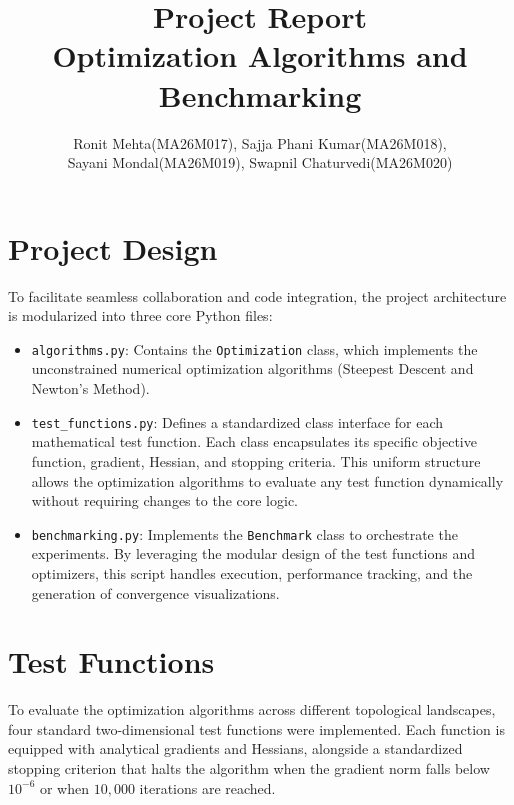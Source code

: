 \documentclass{report}
\title{Project Report\\
  Optimization Algorithms and Benchmarking}
\author{Ronit Mehta(MA26M017), Sajja Phani Kumar(MA26M018),\\
  Sayani Mondal(MA26M019), Swapnil Chaturvedi(MA26M020)}
\date{}
\begin{document}
\maketitle

\section*{Project Design}
To facilitate seamless collaboration and code integration, the project architecture is modularized into three core Python files:

\begin{itemize}
    \item \texttt{algorithms.py}: Contains the \texttt{Optimization} class, which implements the unconstrained numerical optimization algorithms (Steepest Descent and Newton's Method).
    \item \texttt{test\_functions.py}: Defines a standardized class interface for each mathematical test function. Each class encapsulates its specific objective function, gradient, Hessian, and stopping criteria. This uniform structure allows the optimization algorithms to evaluate any test function dynamically without requiring changes to the core logic.
    \item \texttt{benchmarking.py}: Implements the \texttt{Benchmark} class to orchestrate the experiments. By leveraging the modular design of the test functions and optimizers, this script handles execution, performance tracking, and the generation of convergence visualizations.
\end{itemize}



\section*{Test Functions}
To evaluate the optimization algorithms across different topological landscapes, four standard two-dimensional test functions were implemented. Each function is equipped with analytical gradients and Hessians, alongside a standardized stopping criterion that halts the algorithm when the gradient norm falls below $10^{-6}$ or when $10,000$ iterations are reached.
\end{document}
